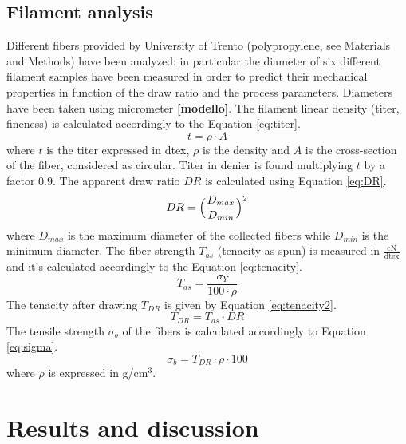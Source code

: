 \documentclass[a4paper, 11pt]{article}
\begin{document}
\newpage

\subsection{Filament analysis}

Different fibers provided by University of Trento (polypropylene, see Materials and Methods) have been analyzed: in particular the diameter of six different filament samples have been measured in order to predict their mechanical properties in function of the draw ratio and the process parameters. 
Diameters have been taken using micrometer \textbf{[modello]}. The filament linear density (titer, fineness) is calculated accordingly to the Equation \ref{eq:titer}. 
\begin{equation}
	t = \rho \cdot A
	\label{eq:titer}
\end{equation}
where $t$ is the titer expressed in dtex, $\rho$ is the density and $A$ is the cross-section of the fiber, considered as circular. Titer in denier is found multiplying $t$ by a factor 0.9. The apparent draw ratio $DR$ is calculated using Equation \ref{eq:DR}. 
\begin{equation}
	DR = \Bigl(\frac{D_{max}}{D_{min}}\Bigr)^2
	\label{eq:DR}
\end{equation}
where $D_{max}$ is the maximum diameter of the collected fibers while $D_{min}$ is the minimum diameter. The fiber strength $T_{as}$ (tenacity as spun) is measured in $\frac{\text{cN}}{\text{dtex}}$ and it's calculated accordingly to the Equation \ref{eq:tenacity}. 
\begin{equation}
	T_{as} = \frac{\sigma_Y}{100\cdot \rho}
	\label{eq:tenacity}
\end{equation}
The tenacity after drawing $T_{DR}$ is given by Equation \ref{eq:tenacity2}. 
\begin{equation}
	T_{DR} = T_{as}\cdot DR
	\label{eq:tenacity2}
\end{equation}
The tensile strength $\sigma_b$ of the fibers is calculated accordingly to Equation \ref{eq:sigma}.
\begin{equation}
	\sigma_{b} = T_{DR}\cdot \rho \cdot 100
	\label{eq:sigma}
\end{equation}
where $\rho$ is expressed in g/cm$^3$. 

\newpage

\section{Results and discussion}
\end{document}
